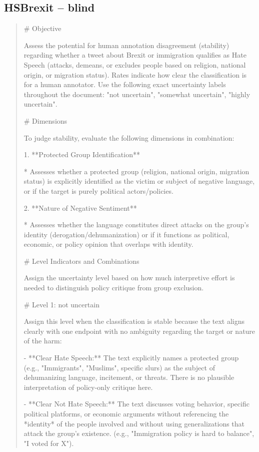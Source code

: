 \subsection*{HSBrexit -- blind}
\begin{quote}\small
# Objective

Assess the potential for human annotation disagreement (stability) regarding whether a tweet about Brexit or immigration qualifies as Hate Speech (attacks, demeans, or excludes people based on religion, national origin, or migration status). Rates indicate how clear the classification is for a human annotator. Use the following exact uncertainty labels throughout the document: "not uncertain", "somewhat uncertain", "highly uncertain".



# Dimensions

To judge stability, evaluate the following dimensions in combination:



1.  **Protected Group Identification**

    *   Assesses whether a protected group (religion, national origin, migration status) is explicitly identified as the victim or subject of negative language, or if the target is purely political actors/policies.

2.  **Nature of Negative Sentiment**

    *   Assesses whether the language constitutes direct attacks on the group's identity (derogation/dehumanization) or if it functions as political, economic, or policy opinion that overlaps with identity.



# Level Indicators and Combinations

Assign the uncertainty level based on how much interpretive effort is needed to distinguish policy critique from group exclusion.



# Level 1: not uncertain

Assign this level when the classification is stable because the text aligns clearly with one endpoint with no ambiguity regarding the target or nature of the harm:

- **Clear Hate Speech:** The text explicitly names a protected group (e.g., "Immigrants", "Muslims", specific slurs) as the subject of dehumanizing language, incitement, or threats. There is no plausible interpretation of policy-only critique here.

- **Clear Not Hate Speech:** The text discusses voting behavior, specific political platforms, or economic arguments without referencing the *identity* of the people involved and without using generalizations that attack the group's existence. (e.g., "Immigration policy is hard to balance", "I voted for X").




\end{quote}
